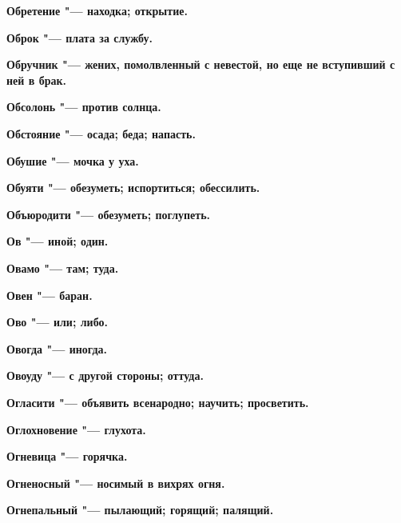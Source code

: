 \bfseries Обретение \normalfont{} "--- находка; открытие. 




\bfseries Оброк \normalfont{} "--- плата за службу. 




\bfseries Обручник \normalfont{} "--- жених, помолвленный с невестой, но еще не вступивший с ней в брак. 




\bfseries Обсолонь \normalfont{} "--- против солнца. 




\bfseries Обстояние \normalfont{} "--- осада; беда; напасть. 




\bfseries Обушие \normalfont{} "--- мочка у уха. 




\bfseries Обуяти \normalfont{} "--- обезуметь; испортиться; обессилить. 




\bfseries Объюродити \normalfont{} "--- обезуметь; поглупеть. 




\bfseries Ов \normalfont{} "--- иной; один. 




\bfseries Овамо \normalfont{} "--- там; туда. 




\bfseries Овен \normalfont{} "--- баран. 




\bfseries Ово \normalfont{} "--- или; либо. 




\bfseries Овогда \normalfont{} "--- иногда. 




\bfseries Овоуду \normalfont{} "--- с другой стороны; оттуда. 




\bfseries Огласити \normalfont{} "--- объявить всенародно; научить; просветить. 




\bfseries Оглохновение \normalfont{} "--- глухота. 




\bfseries Огневица \normalfont{} "--- горячка. 




\bfseries Огненосный \normalfont{} "--- носимый в вихрях огня. 




\bfseries Огнепальный \normalfont{} "--- пылающий; горящий; палящий. 




